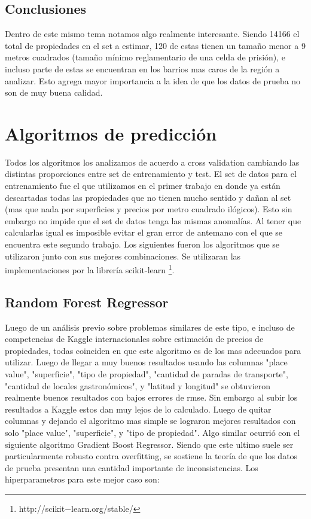 \documentclass[a4paper, 10pt]{article}
\begin{document}
		\subsection{Conclusiones}
		Dentro de este mismo tema notamos algo realmente interesante. Siendo 14166 el total de propiedades en el set a estimar, 120 de estas tienen un tamaño menor a 9 metros cuadrados (tamaño mínimo reglamentario de una celda de prisión), e incluso parte de estas se encuentran en los barrios mas caros de la región a analizar. Esto agrega mayor importancia a la idea de que los datos de prueba no son de muy buena calidad. 
	
	\section{Algoritmos de predicción}
		Todos los algoritmos los analizamos de acuerdo a cross validation cambiando las distintas proporciones entre set de entrenamiento y test. El set de datos para el entrenamiento fue el que utilizamos en el primer trabajo en donde ya están descartadas todas las propiedades que no tienen mucho sentido y dañan al set (mas que nada por superficies y precios por metro cuadrado ilógicos). Esto sin embargo no impide que el set de datos tenga las mismas anomalías. Al tener que calcularlas igual es imposible evitar el gran error de antemano con el que se encuentra este segundo trabajo. Los siguientes fueron los algoritmos que se utilizaron junto con sus mejores combinaciones. Se utilizaran las implementaciones por la librería scikit-learn \footnote{http://scikit$-$learn.org/stable/}. 
		
		\subsection{Random Forest Regressor}
		
			Luego de un análisis previo sobre problemas similares de este tipo, e incluso de competencias de Kaggle internacionales sobre estimación de precios de propiedades, todas coinciden en que este algoritmo es de los mas adecuados para utilizar. Luego de llegar a muy buenos resultados usando las columnas "place value", "superficie", "tipo de propiedad", "cantidad de paradas de transporte", "cantidad de locales gastronómicos", y "latitud y longitud" se obtuvieron realmente buenos resultados con bajos errores de rmse. Sin embargo al subir los resultados a Kaggle estos dan muy lejos de lo calculado. Luego de quitar columnas y dejando el algoritmo mas simple se lograron mejores resultados con solo "place value", "superficie", y "tipo de propiedad". Algo similar ocurrió con el siguiente algoritmo Gradient Boost Regressor. Siendo que este ultimo suele ser particularmente robusto contra overfitting, se sostiene la teoría de que los datos de prueba presentan una cantidad importante de inconsistencias. Los hiperparametros para este mejor caso son:
			 
\end{document}
